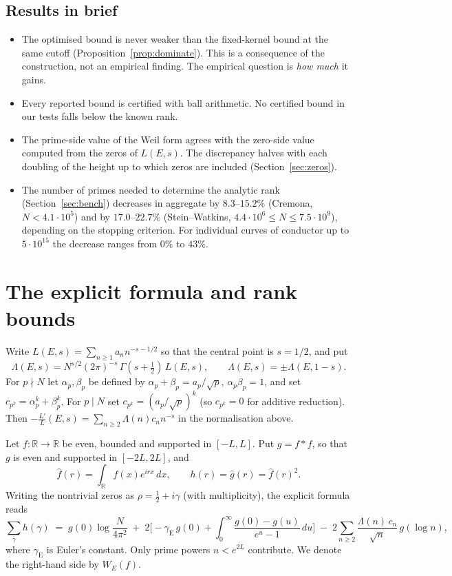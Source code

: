 \documentclass[11pt]{amsart}
\theoremstyle{remark}
\theoremstyle{definition}
\newcommand{\R}{\mathbb{R}}
\begin{document}
\subsection*{Results in brief}
\begin{itemize}
\item The optimised bound is never weaker than the fixed-kernel bound at the same cutoff (Proposition~\ref{prop:dominate}). This is a consequence of the construction, not an empirical finding. The empirical question is \emph{how much} it gains.
\item Every reported bound is certified with ball arithmetic. No certified bound in our tests falls below the known rank.
\item The prime-side value of the Weil form agrees with the zero-side value computed from the zeros of $L(E,s)$. The discrepancy halves with each doubling of the height up to which zeros are included (Section~\ref{sec:zeros}).
\item The number of primes needed to determine the analytic rank (Section~\ref{sec:bench}) decreases in aggregate by $8.3$--$15.2\%$ (Cremona, $N<4.1\cdot 10^5$) and by $17.0$--$22.7\%$ (Stein--Watkins, $4.4\cdot10^6\le N\le 7.5\cdot 10^9$), depending on the stopping criterion. For individual curves of conductor up to $5\cdot 10^{15}$ the decrease ranges from $0\%$ to $43\%$.
\end{itemize}

\section{The explicit formula and rank bounds}

Write $L(E,s)=\sum_{n\ge1} a_n n^{-s-1/2}$ so that the central point is $s=1/2$, and put
\[
\Lambda(E,s) = N^{s/2}(2\pi)^{-s}\,\Gamma(s+\tfrac12)\,L(E,s), \qquad \Lambda(E,s)=\pm\Lambda(E,1-s).
\]
For $p\nmid N$ let $\alpha_p,\beta_p$ be defined by $\alpha_p+\beta_p=a_p/\sqrt p$, $\alpha_p\beta_p=1$, and set $c_{p^k}=\alpha_p^k+\beta_p^k$. For $p\mid N$ set $c_{p^k}=(a_p/\sqrt p)^k$ (so $c_{p^k}=0$ for additive reduction). Then $-\frac{L'}{L}(E,s)=\sum_{n\ge2}\Lambda(n)c_n n^{-s}$ in the normalisation above.

Let $f\colon\R\to\R$ be even, bounded and supported in $[-L,L]$. Put $g=f*f$, so that $g$ is even and supported in $[-2L,2L]$, and
\[
\hat f(r)=\int_{\R} f(x)e^{irx}\,dx,\qquad h(r)=\hat g(r)=\hat f(r)^2 .
\]
Writing the nontrivial zeros as $\rho=\tfrac12+i\gamma$ (with multiplicity), the explicit formula reads
\begin{equation}\label{eq:explicit}
\sum_{\gamma} h(\gamma) \;=\; g(0)\log\frac{N}{4\pi^2}
\;+\;2\Big[-\gamma_{\mathrm E}\,g(0)+\int_0^{\infty}\frac{g(0)-g(u)}{e^{u}-1}\,du\Big]
\;-\;2\sum_{n\ge 2}\frac{\Lambda(n)\,c_n}{\sqrt n}\,g(\log n),
\end{equation}
where $\gamma_{\mathrm E}$ is Euler's constant. Only prime powers $n<e^{2L}$ contribute. We denote the right-hand side by $W_E(f)$.
\end{document}
